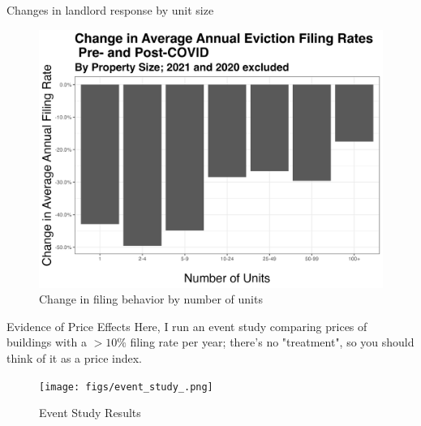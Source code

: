 \documentclass[10pt, xcolor=dvipsnames]{beamer}
\begin{document}
\begin{frame}{Changes in landlord response by unit size}
    \begin{figure}
        \centering
        \includegraphics[width=0.75\linewidth]{figs/change_in_avg_annual_eviction_filing_rates_pre_post_COVID_by_num_units.png}
        \caption{Change in filing behavior by number of units}
        \label{fig:change-evict-units}
    \end{figure}
\end{frame}

    

\begin{frame}{Evidence of Price Effects}
    Here, I run an event study comparing prices of buildings with a $>10\%$ filing rate per year; there's no "treatment", so you should think of it as a price index.
    \begin{figure}
        \centering
        \texttt{[image: figs/event\_study\_.png]}
        \caption{Event Study Results}
        \label{fig:placeholder}
    \end{figure}
    
\end{frame}
\end{document}
